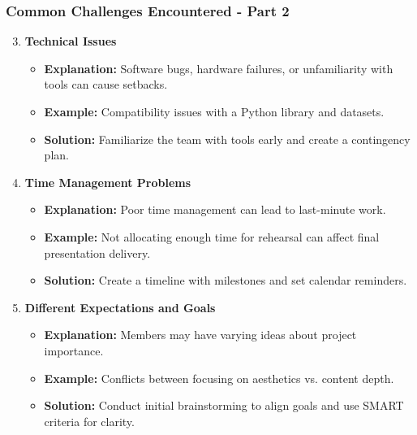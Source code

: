 \documentclass[aspectratio=169]{beamer}
\begin{document}
\begin{frame}[fragile]
    \frametitle{Common Challenges Encountered - Part 2}
    \begin{enumerate}
        \setcounter{enumi}{2} %
        \item \textbf{Technical Issues}
            \begin{itemize}
                \item \textbf{Explanation:} Software bugs, hardware failures, or unfamiliarity with tools can cause setbacks.
                \item \textbf{Example:} Compatibility issues with a Python library and datasets.
                \item \textbf{Solution:} Familiarize the team with tools early and create a contingency plan.
            \end{itemize}

        \item \textbf{Time Management Problems}
            \begin{itemize}
                \item \textbf{Explanation:} Poor time management can lead to last-minute work.
                \item \textbf{Example:} Not allocating enough time for rehearsal can affect final presentation delivery.
                \item \textbf{Solution:} Create a timeline with milestones and set calendar reminders.
            \end{itemize}

        \item \textbf{Different Expectations and Goals}
            \begin{itemize}
                \item \textbf{Explanation:} Members may have varying ideas about project importance.
                \item \textbf{Example:} Conflicts between focusing on aesthetics vs. content depth.
                \item \textbf{Solution:} Conduct initial brainstorming to align goals and use SMART criteria for clarity.
            \end{itemize}
    \end{enumerate}
\end{frame}
\end{document}
